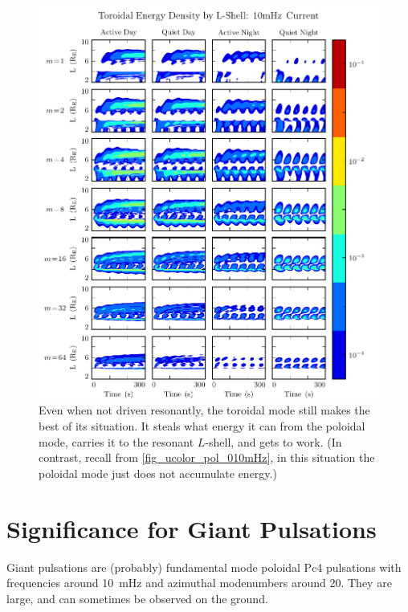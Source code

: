 \begin{figure}[H]
    \centering
    \includegraphics[width=\textwidth]{figures/ucolor_tor_010mHz.pdf}
    \caption[Toroidal Energy Density by L-Shell: 10mHz]{
      Even when not driven resonantly, the toroidal mode still makes the best of its situation. It steals what energy it can from the poloidal mode, carries it to the resonant $L$-shell, and gets to work. (In contrast, recall from \cref{fig_ucolor_pol_010mHz}, in this situation the poloidal mode just does not accumulate energy.)
    }
    \label{fig_ucolor_tor_010mHz}
\end{figure}


\section{Significance for Giant Pulsations}

Giant pulsations are (probably\cite{takahashi_2011}) fundamental mode poloidal Pc4 pulsations with frequencies around \SI{10}{\mHz} and azimuthal modenumbers around \num{20}. They are large, and can sometimes be observed on the ground. 

